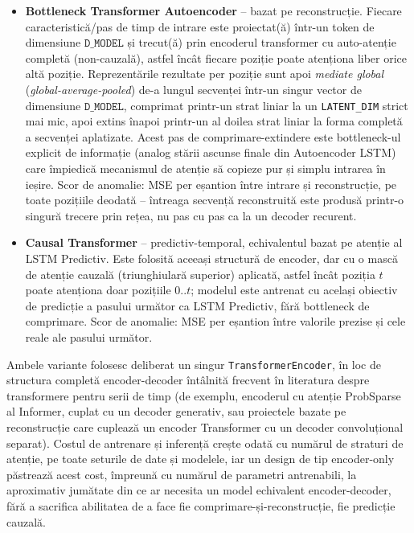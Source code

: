 \begin{itemize}
  \item \textbf{Bottleneck Transformer Autoencoder} -- bazat pe reconstrucție. Fiecare caracteristică/pas de timp de intrare este proiectat(ă) într-un token de dimensiune $\texttt{D\_MODEL}$ și trecut(ă) prin encoderul transformer cu auto-atenție completă (non-cauzală), astfel încât fiecare poziție poate atenționa liber orice altă poziție. Reprezentările rezultate per poziție sunt apoi \emph{mediate global} (\emph{global-average-pooled}) de-a lungul secvenței într-un singur vector de dimensiune $\texttt{D\_MODEL}$, comprimat printr-un strat liniar la un \texttt{LATENT\_DIM} strict mai mic, apoi extins înapoi printr-un al doilea strat liniar la forma completă a secvenței aplatizate. 
  Acest pas de comprimare-extindere este bottleneck-ul explicit de informație (analog stării ascunse finale din Autoencoder LSTM) care împiedică mecanismul de atenție să copieze pur și simplu intrarea în ieșire. 
  Scor de anomalie: MSE per eșantion între intrare și reconstrucție, pe toate pozițiile deodată -- întreaga secvență reconstruită este produsă printr-o singură trecere prin rețea, nu pas cu pas ca la un decoder recurent.
  \item \textbf{Causal Transformer} -- predictiv-temporal, echivalentul bazat pe atenție al LSTM Predictiv. Este folosită aceeași structură de encoder, dar cu o mască de atenție cauzală (triunghiulară superior) aplicată, astfel încât poziția $t$ poate atenționa doar pozițiile $0..t$; modelul este antrenat cu același obiectiv de predicție a pasului următor ca LSTM Predictiv, fără bottleneck de comprimare. 
  Scor de anomalie: MSE per eșantion între valorile prezise și cele reale ale pasului următor.
\end{itemize}

Ambele variante folosesc deliberat un singur \texttt{TransformerEncoder}, în loc de structura completă encoder-decoder întâlnită frecvent în literatura despre transformere pentru serii de timp (de exemplu, encoderul cu atenție ProbSparse al Informer, cuplat cu un decoder generativ, sau proiectele bazate pe reconstrucție care cuplează un encoder Transformer cu un decoder convoluțional separat). Costul de antrenare și inferență crește odată cu numărul de straturi de atenție, pe toate seturile de date și modelele, iar un design de tip encoder-only păstrează acest cost, împreună cu numărul de parametri antrenabili, la aproximativ jumătate din ce ar necesita un model echivalent encoder-decoder, fără a sacrifica abilitatea de a face fie comprimare-și-reconstrucție, fie predicție cauzală.

